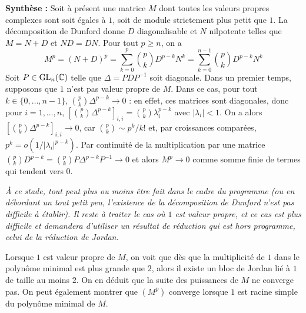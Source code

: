 \begin{solution}
    \textbf{Synthèse :} Soit à présent une matrice $M$ dont toutes les valeurs propres complexes sont soit égales à $1$, soit de module strictement plus petit que $1$.
    La décomposition de Dunford donne $D$ diagonalisable et $N$ nilpotente telles que $M=N+D$ et $ND=DN$.
    Pour tout $p\geq n$, on a 
    \[
        M^p=(N+D)^p=\sum_{k=0}^p\binom pkD^{p-k}N^k=\sum_{k=0}^{n-1}\binom pk D^{p-k}N^k   \tag*{(*)} 
    \]
    Soit $P\in\operatorname{GL}_n(\operatorname{\mathbb C})$ telle que $\Delta=PDP^{-1}$ soit diagonale. 
    Dans un premier temps, supposons que $1$ n'est pas valeur propre de $M$.
    Dans ce cas, pour tout $k\in\lbrace0,\dots,n-1\rbrace$, $\binom pk\Delta^{p-k}\to 0$ : en effet,
    ces matrices sont diagonales, donc pour $i=1,\dots,n$, $\left[\binom pk\Delta^{p-k}\right]_{i,i}=\binom pk\lambda_i^{p-k}$ avec 
    $|\lambda_i|<1$. On a alors $\left[\binom pk\Delta^{p-k}\right]_{i,i}\to 0$, car $\binom pk\sim p^k/k!$ et, par croissances comparées, $p^k=o\left(1/|\lambda_i|^{p-k}\right)$.
    Par continuité de la multiplication par une matrice $\binom pk D^{p-k}=\binom pkP\Delta^{p-k}P^{-1}\to 0$ et alors $M^p\to 0$ comme somme finie de termes qui tendent vers $0$.
    
    \textit{À ce stade, tout peut plus ou moins être fait dans le cadre du programme (ou en débordant un tout petit peu, l'existence de la décomposition de Dunford n'est pas difficile à établir). Il reste à traiter le cas où $1$ est valeur propre, et ce cas est plus difficile et demandera d'utiliser un résultat de réduction qui est hors programme, celui de la réduction de Jordan.}
   
   
    Lorsque $1$ est valeur propre de $M$, on voit que dès que la multiplicité de $1$ dans le polynôme minimal est plus grande que $2$, alors il existe un bloc de Jordan lié à $1$ de taille au moins $2$. On en déduit que la suite des puissances de $M$ ne converge pas. On peut également montrer que $(M^p)$ converge lorsque $1$ est racine simple du polynôme minimal de $M$.
\end{solution}